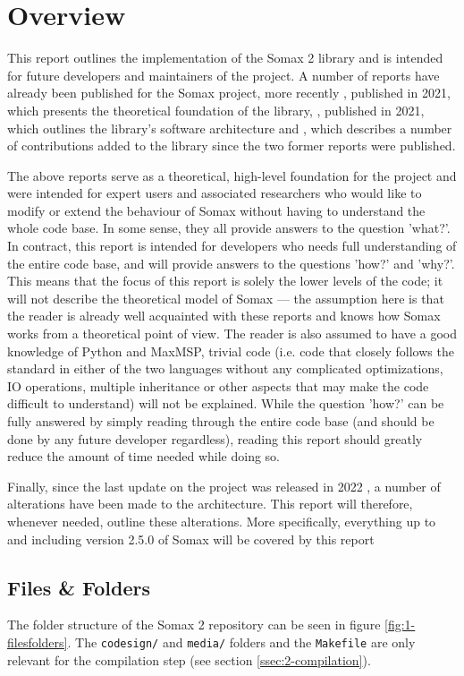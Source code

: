 \chapter{Overview}\label{sec:1-overview}

This report outlines the implementation of the Somax 2 library and is intended for future developers and maintainers of the project. A number of reports have already been published for the Somax project, more recently \cite{somaxtheory2021}, published in 2021, which presents the theoretical foundation of the library, \cite{somaxsoftware2021}, published in 2021, which outlines the library's software architecture and \cite{somaxmidterm2022}, which describes a number of contributions added to the library since the two former reports were published.

The above reports serve as a theoretical, high-level foundation for the project and were intended for expert users and associated researchers who would like to modify or extend the behaviour of Somax without having to understand the whole code base. In some sense, they all provide answers to the question 'what?'. In contract, this report is intended for developers who needs full understanding of the entire code base, and will provide answers to the questions 'how?' and 'why?'. This means that the focus of this report is solely the lower levels of the code; it will not describe the theoretical model of Somax — the assumption here is that the reader is already well acquainted with these reports and knows how Somax works from a theoretical point of view. The reader is also assumed to have a good knowledge of Python and MaxMSP, trivial code (i.e. code that closely follows the standard in either of the two languages without any complicated optimizations, IO operations, multiple inheritance or other aspects that may make the code difficult to understand) will not be explained. While the question 'how?' can be fully answered by simply reading through the entire code base (and should be done by any future developer regardless), reading this report should greatly reduce the amount of time needed while doing so.

Finally, since the last update on the project was released in 2022 \cite{somaxmidterm2022}, a number of alterations have been made to the architecture. This report will therefore, whenever needed, outline these alterations. More specifically, everything up to and including version 2.5.0 of Somax will be covered by this report


\section{Files \& Folders}\label{ssec:1-filesfolders}
The folder structure of the Somax 2 repository \cite{somaxrepo} can be seen in figure \ref{fig:1-filesfolders}. The \texttt{codesign/} and \texttt{media/} folders and the \texttt{Makefile} are only relevant for the compilation step (see section \ref{ssec:2-compilation}). 


